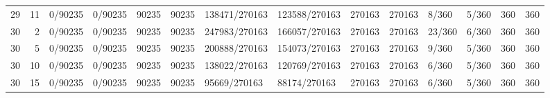 \begin{tabular}{rrllrrllrrllrr}
29 & 11 &         0/90235 &    0/90235 &          90235 &      90235 & 138471/270163 & 123588/270163 &         270163 &     270163 &       8/360 &      5/360 &        360 &        360 \\
30 &  2 &         0/90235 &    0/90235 &          90235 &      90235 & 247983/270163 & 166057/270163 &         270163 &     270163 &      23/360 &      6/360 &        360 &        360 \\
30 &  5 &         0/90235 &    0/90235 &          90235 &      90235 & 200888/270163 & 154073/270163 &         270163 &     270163 &       9/360 &      5/360 &        360 &        360 \\
30 & 10 &         0/90235 &    0/90235 &          90235 &      90235 & 138022/270163 & 120769/270163 &         270163 &     270163 &       6/360 &      5/360 &        360 &        360 \\
30 & 15 &         0/90235 &    0/90235 &          90235 &      90235 &  95669/270163 &  88174/270163 &         270163 &     270163 &       6/360 &      5/360 &        360 &        360 \\
\bottomrule
\end{tabular}
